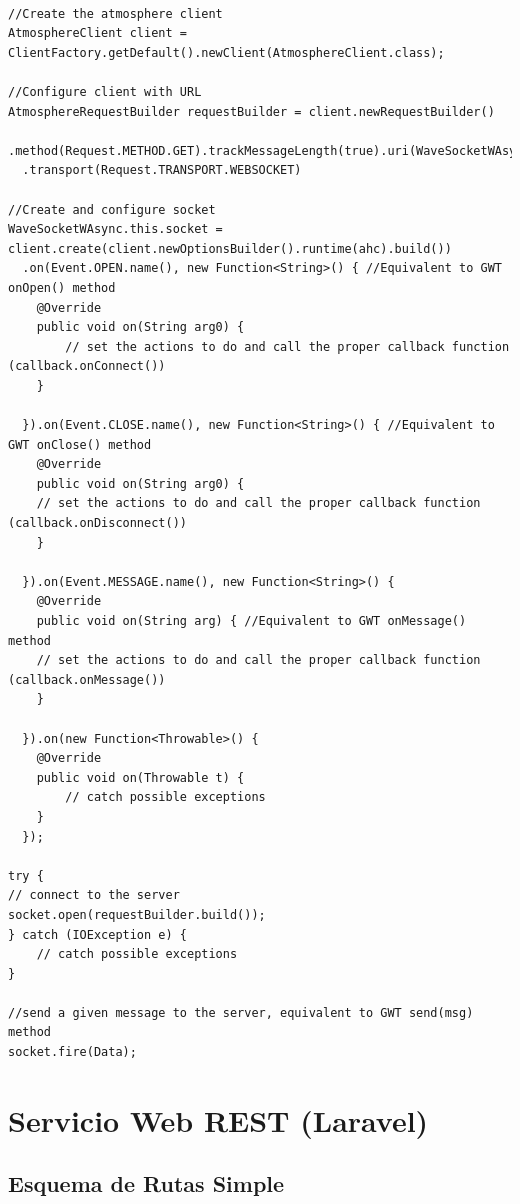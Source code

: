 	  \begin{lstlisting}[frame=single]	  	  
	  
//Create the atmosphere client
AtmosphereClient client = ClientFactory.getDefault().newClient(AtmosphereClient.class);

//Configure client with URL
AtmosphereRequestBuilder requestBuilder = client.newRequestBuilder()
  .method(Request.METHOD.GET).trackMessageLength(true).uri(WaveSocketWAsync.this.urlBase)
  .transport(Request.TRANSPORT.WEBSOCKET)
  
//Create and configure socket
WaveSocketWAsync.this.socket = client.create(client.newOptionsBuilder().runtime(ahc).build())
  .on(Event.OPEN.name(), new Function<String>() { //Equivalent to GWT onOpen() method
    @Override
    public void on(String arg0) {
		// set the actions to do and call the proper callback function (callback.onConnect())
    }
    
  }).on(Event.CLOSE.name(), new Function<String>() { //Equivalent to GWT onClose() method
    @Override
    public void on(String arg0) {
    // set the actions to do and call the proper callback function (callback.onDisconnect())
    }
    
  }).on(Event.MESSAGE.name(), new Function<String>() {
    @Override
    public void on(String arg) { //Equivalent to GWT onMessage() method
    // set the actions to do and call the proper callback function (callback.onMessage())
    }
    
  }).on(new Function<Throwable>() {
    @Override
    public void on(Throwable t) {
		// catch possible exceptions
    }
  });
          
try {
// connect to the server
socket.open(requestBuilder.build());
} catch (IOException e) {
	// catch possible exceptions
}
      
//send a given message to the server, equivalent to GWT send(msg) method 
socket.fire(Data);
	\end{lstlisting}
	  
\section{Servicio Web REST (Laravel)}

\subsection{Esquema de Rutas Simple}\label{ssec:codeRoutesSimple}

